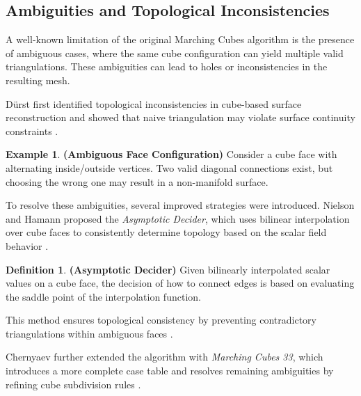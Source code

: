 \documentclass[12pt, a4paper, oneside]{book}
\theoremstyle{plain}
\theoremstyle{definition}
\newtheorem{definition}[theorem]{Definition}
\newtheorem{example}[theorem]{Example}
\theoremstyle{remark}
\theoremstyle{definition}
\begin{document}
\vspace{0.5em}

\subsection{Ambiguities and Topological Inconsistencies}

A well-known limitation of the original Marching Cubes algorithm is the presence of ambiguous cases, where the same cube configuration can yield multiple valid triangulations. These ambiguities can lead to holes or inconsistencies in the resulting mesh.

Dürst first identified topological inconsistencies in cube-based surface reconstruction and showed that naive triangulation may violate surface continuity constraints \cite{durst1988marching}.

\begin{example}
    \textbf{(Ambiguous Face Configuration)}
Consider a cube face with alternating inside/outside vertices. Two valid diagonal connections exist, but choosing the wrong one may result in a non-manifold surface.
\end{example}


\vspace{0.5em}

To resolve these ambiguities, several improved strategies were introduced. Nielson and Hamann proposed the \emph{Asymptotic Decider}, which uses bilinear interpolation over cube faces to consistently determine topology based on the scalar field behavior \cite{nielson1991asymptotic}.

\begin{definition}
    \textbf{(Asymptotic Decider)}
Given bilinearly interpolated scalar values on a cube face, the decision of how to connect edges is based on evaluating the saddle point of the interpolation function.
\end{definition}


This method ensures topological consistency by preventing contradictory triangulations within ambiguous faces \cite{nielson1991asymptotic}.

\vspace{0.5em}

Chernyaev further extended the algorithm with \emph{Marching Cubes 33}, which introduces a more complete case table and resolves remaining ambiguities by refining cube subdivision rules \cite{chernyaev1995marching}.

\vspace{0.5em}
\end{document}
